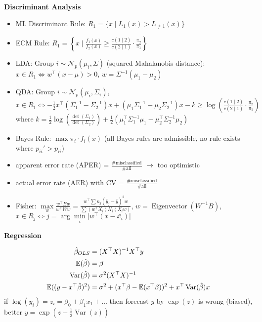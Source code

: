 \documentclass[10pt,landscape,a4paper]{article}
\newcommand{\E}{\mathbb{E}}
\DeclareMathOperator{\Var}{Var}
\DeclareMathOperator{\Eigenvector}{Eigenvector}
\begin{document}
\begin{multicols*}{4}
\begin{center}
	\normalsize{\textbf{Discriminant Analysis}} \\
\end{center}
\begin{itemize}
	\item ML Discriminant Rule: $R_1 = \{x \mid L_1(x) > L_{\neq 1}(x)\}$
	\item ECM Rule: $R_1 = \left\lbrace x\mid \frac{f_1(x)}{f_2(x)} \ge \frac{c(1\mid 2)}{c(2\mid 1)}\cdot\frac{\pi_2}{\pi_1}\right\rbrace$
	\item LDA: Group $i\sim \mathcal{N}_p(\mu_i,\Sigma)$ (squared Mahalanobis distance): $x\in R_1\Leftrightarrow w^\top (x-\mu) > 0$, $w=\Sigma^{-1}(\mu_1-\mu_2)$
	\item QDA: Group $i\sim\mathcal{N}_p(\mu_i,\Sigma_i)$, $x\in R_1 \Leftrightarrow -\frac{1}{2}x^\top(\Sigma_1^{-1}-\Sigma_2^{-1})x + (\mu_1\Sigma_1^{-1} - \mu_2\Sigma_2^{-1})x - k \ge \log\left(\frac{c(1\mid 2)}{c(2\mid 1)}\cdot\frac{\pi_2}{\pi_1}\right)$ where $k = \frac{1}{2}\log\left(\frac{\det(\Sigma_1)}{\det(\Sigma_2)}\right) + \frac{1}{2}(\mu_1^\top\Sigma_1^{-1}\mu_1 - \mu_2^\top\Sigma_2^{-1}\mu_2)$
	\item Bayes Rule: $\max \pi_i\cdot f_i(x)$ (all Bayes rules are admissible, no rule exists where $p_{ii}' > p_{ii}$)
	\item apparent error rate (APER) = $\frac{\#\text{misclassified}}{\#\text{all}}$ $\to$ too optimistic
	\item actual error rate (AER) with CV = $\frac{\#\text{misclassified}}{\#\text{all}}$
	\item Fisher: $\max\limits_{w} \frac{w^\top Bw}{w^\top Ww} = \frac{w^\top\sum n_j(\bar{y}_j - \bar{y})^2w}{\sum (w^\top X_i)H_i(X_iw)}$, $w = \Eigenvector(W^{-1}B)$, $x\in R_j \Leftrightarrow j=\arg\min\limits_{i} \vert w^\top (x-\bar{x_i})\vert$
\end{itemize}

\begin{center}
	\normalsize{\textbf{Regression}} \\
\end{center}
\begin{align}
	\hat{\beta}_{OLS} &= (X^\top X)^{-1}X^\top y \notag \\
	\E(\hat{\beta}) &= \beta \notag \\
	\Var(\hat{\beta}) &= \sigma^2(X^\top X)^{-1} \notag \\
	\E((y-x^\top \hat{\beta})^2) &= \sigma^2 + (x^\top\beta - \E(x^\top\beta))^2 + x^\top\Var(\hat{\beta})x \notag
\end{align}
if $\log(y_i) = z_i = \beta_0 + \beta_1x_1 + \dots$ then forecast $y$ by $\exp(z)$ is wrong (biased), better $y=\exp(z + \frac{1}{2}\Var(z))$


\end{multicols*}
\end{document}
